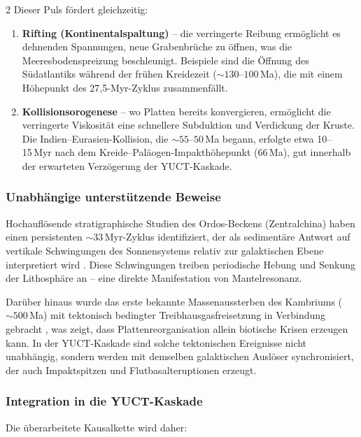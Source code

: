 \documentclass[11pt,a4paper]{article}
\begin{document}
\begin{multicols}{2}
		Dieser Puls fördert gleichzeitig:
		
		\begin{enumerate}
			\item \textbf{Rifting (Kontinentalspaltung)} – die verringerte Reibung ermöglicht es
			dehnenden Spannungen, neue Grabenbrüche zu öffnen, was die Meeresbodenspreizung beschleunigt.
			Beispiele sind die Öffnung des Südatlantiks während der frühen Kreidezeit
			(\(\sim 130\)–\(100\) Ma), die mit einem Höhepunkt des 27,5-Myr-Zyklus zusammenfällt.
			\item \textbf{Kollisionsorogenese} – wo Platten bereits konvergieren, ermöglicht die verringerte
			Viskosität eine schnellere Subduktion und Verdickung der Kruste.
			Die Indien–Eurasien-Kollision, die \(\sim 55\)–\(50\) Ma begann, erfolgte etwa
			10–15 Myr nach dem Kreide–Paläogen-Impakthöhepunkt (66 Ma), gut innerhalb der
			erwarteten Verzögerung der YUCT-Kaskade.
		\end{enumerate}
		
		\subsubsection{Unabhängige unterstützende Beweise}
		
		Hochauflösende stratigraphische Studien des Ordos-Beckens (Zentralchina) haben einen persistenten
		\(\sim 33\) Myr-Zyklus identifiziert, der als sedimentäre Antwort auf vertikale
		Schwingungen des Sonnensystems relativ zur galaktischen Ebene interpretiert wird \cite{Rampino2021}.
		Diese Schwingungen treiben periodische Hebung und Senkung der Lithosphäre an – eine direkte
		Manifestation von Mantelresonanz.
		
		Darüber hinaus wurde das erste bekannte Massenaussterben des Kambriums (\(\sim 500\) Ma) mit
		tektonisch bedingter Treibhausgasfreisetzung in Verbindung gebracht \cite{Jablonski1991}, was zeigt, dass
		Plattenreorganisation allein biotische Krisen erzeugen kann. In der YUCT-Kaskade sind solche
		tektonischen Ereignisse nicht unabhängig, sondern werden mit demselben galaktischen Auslöser synchronisiert, der auch Impaktspitzen und Flutbasalteruptionen erzeugt.
		
		\subsubsection{Integration in die YUCT-Kaskade}
		
		Die überarbeitete Kausalkette wird daher:
		
	\end{multicols}
	
\end{document}
